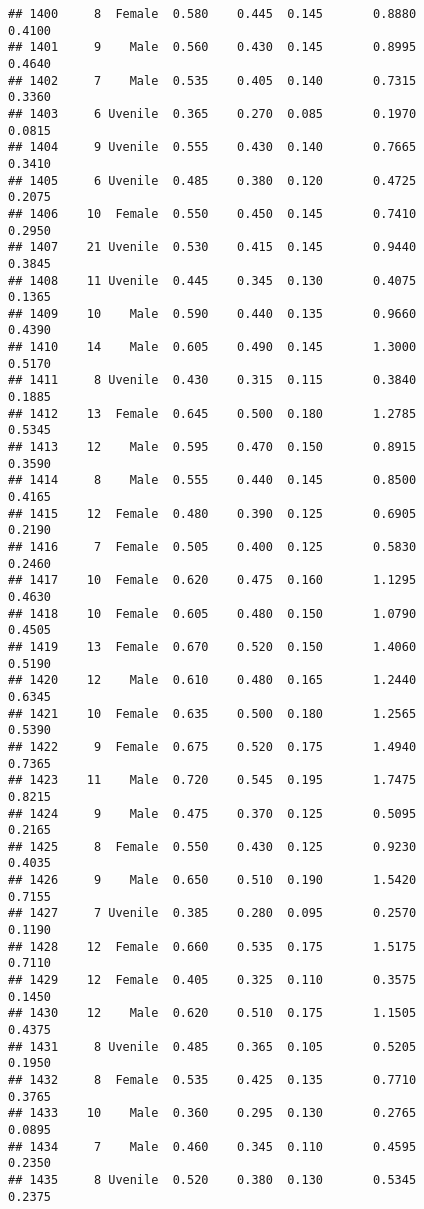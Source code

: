 \documentclass[
]{article}
\begin{document}
\begin{verbatim}
## 1400     8  Female  0.580    0.445  0.145       0.8880         0.4100
## 1401     9    Male  0.560    0.430  0.145       0.8995         0.4640
## 1402     7    Male  0.535    0.405  0.140       0.7315         0.3360
## 1403     6 Uvenile  0.365    0.270  0.085       0.1970         0.0815
## 1404     9 Uvenile  0.555    0.430  0.140       0.7665         0.3410
## 1405     6 Uvenile  0.485    0.380  0.120       0.4725         0.2075
## 1406    10  Female  0.550    0.450  0.145       0.7410         0.2950
## 1407    21 Uvenile  0.530    0.415  0.145       0.9440         0.3845
## 1408    11 Uvenile  0.445    0.345  0.130       0.4075         0.1365
## 1409    10    Male  0.590    0.440  0.135       0.9660         0.4390
## 1410    14    Male  0.605    0.490  0.145       1.3000         0.5170
## 1411     8 Uvenile  0.430    0.315  0.115       0.3840         0.1885
## 1412    13  Female  0.645    0.500  0.180       1.2785         0.5345
## 1413    12    Male  0.595    0.470  0.150       0.8915         0.3590
## 1414     8    Male  0.555    0.440  0.145       0.8500         0.4165
## 1415    12  Female  0.480    0.390  0.125       0.6905         0.2190
## 1416     7  Female  0.505    0.400  0.125       0.5830         0.2460
## 1417    10  Female  0.620    0.475  0.160       1.1295         0.4630
## 1418    10  Female  0.605    0.480  0.150       1.0790         0.4505
## 1419    13  Female  0.670    0.520  0.150       1.4060         0.5190
## 1420    12    Male  0.610    0.480  0.165       1.2440         0.6345
## 1421    10  Female  0.635    0.500  0.180       1.2565         0.5390
## 1422     9  Female  0.675    0.520  0.175       1.4940         0.7365
## 1423    11    Male  0.720    0.545  0.195       1.7475         0.8215
## 1424     9    Male  0.475    0.370  0.125       0.5095         0.2165
## 1425     8  Female  0.550    0.430  0.125       0.9230         0.4035
## 1426     9    Male  0.650    0.510  0.190       1.5420         0.7155
## 1427     7 Uvenile  0.385    0.280  0.095       0.2570         0.1190
## 1428    12  Female  0.660    0.535  0.175       1.5175         0.7110
## 1429    12  Female  0.405    0.325  0.110       0.3575         0.1450
## 1430    12    Male  0.620    0.510  0.175       1.1505         0.4375
## 1431     8 Uvenile  0.485    0.365  0.105       0.5205         0.1950
## 1432     8  Female  0.535    0.425  0.135       0.7710         0.3765
## 1433    10    Male  0.360    0.295  0.130       0.2765         0.0895
## 1434     7    Male  0.460    0.345  0.110       0.4595         0.2350
## 1435     8 Uvenile  0.520    0.380  0.130       0.5345         0.2375

\end{verbatim}
\end{document}
